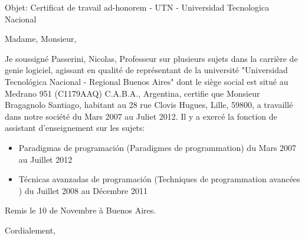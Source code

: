 \documentclass[11pt]{letter} %
\begin{document}

\begin{letter}{} 
\date{}%


\signature{Nicolas Passerini - npasserini@gmail.com} %


Objet: Certificat de travail ad-honorem - UTN - Universidad Tecnologica Nacional 

\opening{Madame, Monsieur,} 

Je soussigné {Passerini, Nicolas}, Professeur sur plusieurs sujets dans la carrière de genie logiciel, agissant en qualité de représentant de la université "Universidad Tecnológica Nacional - Regional Buenos Aires" dont le siège social est situé au Medrano 951 (C1179AAQ) C.A.B.A., Argentina, certifie que Monsieur Bragagnolo Santiago, habitant au 28 rue Clovis Hugues, Lille, 59800, a travaillé dans notre société du Mars 2007 au Juliet 2012. Il y a exercé la fonction de assistant d'enseignement sur les sujets:

\begin{itemize}
	\item Paradigmas de programación (Paradigmes de programmation)  du Mars 2007 au Juillet 2012
	\item Técnicas avanzadas de programación (Techniques de programmation avancées ) du Juillet 2008 au Décembre 2011
\end{itemize} 


Remis le 10 de Novembre à Buenos Aires. 


\closing{Cordialement,}




\end{letter}
\end{document}
